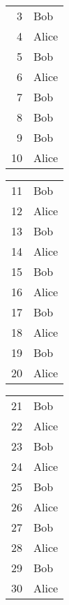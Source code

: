 \documentclass[a4paper]{amsart}
\begin{document}
\begin{flushleft}
\begin{enumerate}
			\begin{minipage}{0.2\textwidth}
			\begin{center}
				\begin{tabular}{r||l}
					3 & Bob \\ 
					4 & Alice \\ 
					5 & Bob \\ 
					6 & Alice \\ 
					7 & Bob \\ 
					8 & Bob \\ 
					9 & Bob \\ 
					10 & Alice \\ 
				\end{tabular}
			\end{center}
			\end{minipage}
			\begin{minipage}{0.2\textwidth}
				\begin{center}
					\begin{tabular}{r||l}
						11 & Bob \\ 
						12 & Alice \\ 
						13 & Bob \\ 
						14 & Alice \\ 
						15 & Bob \\ 
						16 & Alice \\ 
						17 & Bob \\ 
						18 & Alice \\ 
						19 & Bob \\ 
						20 & Alice \\ 
					\end{tabular}
				\end{center}
			\end{minipage}
			\begin{minipage}{0.2\textwidth}
				\begin{center}
					\begin{tabular}{r||l}
						21 & Bob \\ 
						22 & Alice \\ 
						23 & Bob \\ 
						24 & Alice \\ 
						25 & Bob \\ 
						26 & Alice \\ 
						27 & Bob \\ 
						28 & Alice \\ 
						29 & Bob \\ 
						30 & Alice \\ 

\end{tabular}
\end{center}
\end{minipage}
\end{enumerate}
\end{flushleft}
\end{document}
